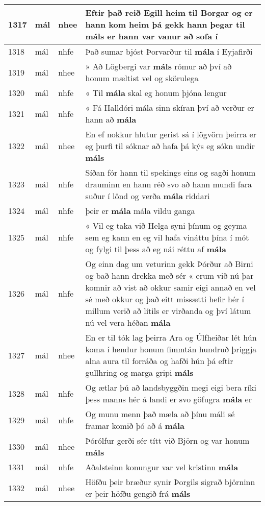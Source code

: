 \documentclass{article}
\begin{document}
\begin{longtable}{p{1cm}|p{1cm}|p{1cm}|p{13cm}}
\hline
1317&mál&nhee&Eftir það reið Egill heim til Borgar og er hann kom heim þá gekk hann þegar til \textbf{máls} er hann var vanur að sofa í\\
\hline
1318&mál&nhfe&Það sumar bjóst Þorvarður til \textbf{mála} í Eyjafirði\\
\hline
1319&mál&nhee&» Að Lögbergi var \textbf{máls} rómur að því að honum mæltist vel og skörulega\\
\hline
1320&mál&nhfe&« Til \textbf{mála} skal eg honum þjóna lengur\\
\hline
1321&mál&nhfe&« Fá Halldóri mála sinn skíran því að verður er hann að \textbf{mála} \\
\hline
1322&mál&nhee&En ef nokkur hlutur gerist sá í lögvörn þeirra er eg þurfi til sóknar að hafa þá kýs eg sókn undir \textbf{máls} \\
\hline
1323&mál&nhfe&Síðan fór hann til spekings eins og sagði honum drauminn en hann réð svo að hann mundi fara suður í lönd og verða \textbf{mála} riddari\\
\hline
1324&mál&nhfe&þeir er \textbf{mála} mála vildu ganga\\
\hline
1325&mál&nhfe&« Vil eg taka við Helga syni þínum og geyma sem eg kann en eg vil hafa vináttu þína í mót og fylgi til þess að eg nái réttu af \textbf{mála} \\
\hline
1326&mál&nhfe&Og einn dag um veturinn gekk Þórður að Birni og bað hann drekka með sér « erum við nú þar komnir að vist að okkur samir eigi annað en vel sé með okkur og það eitt missætti hefir hér í millum verið að lítils er virðanda og því látum nú vel vera héðan \textbf{mála} \\
\hline
1327&mál&nhee&En er til tók lag þeirra Ara og Úlfheiðar lét hún koma í hendur honum fimmtán hundruð þriggja alna aura til forráða og hafði hún þá eftir gullhring og marga gripi \textbf{máls} \\
\hline
1328&mál&nhfe&Og ætlar þú að landsbyggðin megi eigi bera ríki þess manns hér á landi er svo göfugra \textbf{mála} er\\
\hline
1329&mál&nhfe&Og munu menn það mæla að þínu máli sé framar komið þó að á \textbf{mála} \\
\hline
1330&mál&nhee&Þórólfur gerði sér títt við Björn og var honum \textbf{máls} \\
\hline
1331&mál&nhfe&Aðalsteinn konungur var vel kristinn \textbf{mála} \\
\hline
1332&mál&nhee&Höfðu þeir bræður synir Þorgils sigrað björninn er þeir höfðu gengið frá \textbf{máls} \\

\end{longtable}
\end{document}
